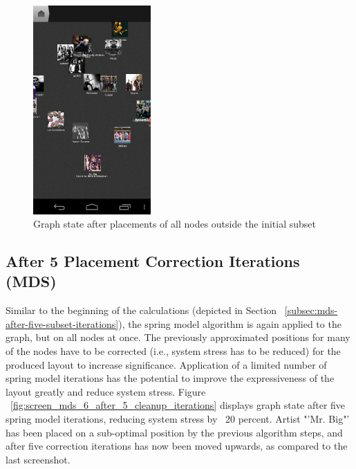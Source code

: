 \begin{figure}[H]
  \centering
    \includegraphics[width=0.4\textwidth]{figures/screen_mds_5_after_all_restnode_additions}
  \caption{Graph state after placements of all nodes outside the initial subset}
  \label{fig:screen_mds_5_after_all_restnode_additions}
\end{figure}

\newpage
\subsection{After 5 Placement Correction Iterations (MDS)}

Similar to the beginning of the calculations (depicted in Section ~\ref{subsec:mds-after-five-subset-iterations}), the spring model algorithm is again applied to the graph, but on all nodes at once. The previously approximated positions for many of the nodes have to be corrected (i.e., system stress has to be reduced) for the produced layout to increase significance. Application of a limited number of spring model iterations has the potential to improve the expressiveness of the layout greatly and reduce system stress. Figure ~\ref{fig:screen_mds_6_after_5_cleanup_iterations} displays graph state after five spring model iterations, reducing system stress by ~20 percent. Artist "'Mr. Big"' has been placed on a sub-optimal position by the previous algorithm steps, and after five correction iterations has now been moved upwards, as compared to the last screenshot.

